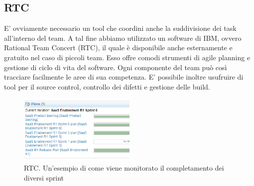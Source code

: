 \subsection{RTC}
E' ovviamente necessario un tool che coordini anche la suddivisione dei task all'interno del team. A tal fine abbiamo utilizzato un software di IBM, ovvero Rational Team Concert (RTC), il quale è disponibile anche esternamente e gratuito nel caso di piccoli team. Esso offre comodi strumenti di agile planning e gestione di ciclo di vita del software. Ogni componente del team può così tracciare facilmente le aree di sua competenza. E' possibile inoltre usufruire di tool per il source control, controllo dei difetti e gestione delle build.
\begin{figure}[h!]
	\centering
	\includegraphics[width=0.5\textwidth,keepaspectratio=true]{capitoli/imgs/rtc2.PNG}
	\caption{RTC. Un'esempio di come viene monitorato il completamento dei diversi sprint}
\end{figure}



